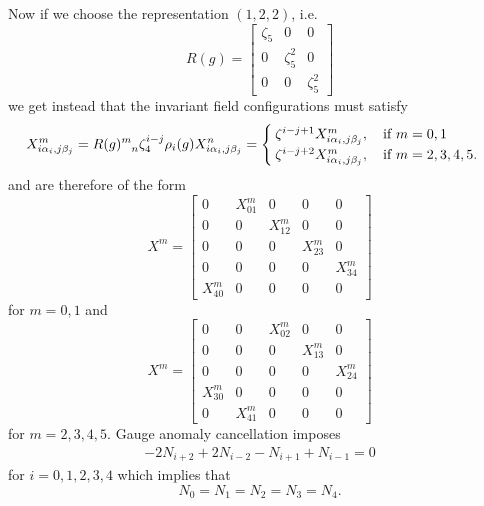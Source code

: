             Now if we choose the representation $(1,2,2)$, i.e.
            \begin{equation}
                R(g)=
                \begin{bmatrix}
                    \zeta_5 & 0 & 0\\
                    0 & \zeta^2_5 & 0\\
                    0 & 0 & \zeta^2_5
                \end{bmatrix}
            \end{equation}
            we get instead that the invariant field configurations must satisfy
            \begin{equation}
                X^m_{i\alpha_i,j\beta_j} = R(g)\indices{^m_n}\zeta^{i-j}_4\rho_i(g)X^n_{i\alpha_i,j\beta_j} =
                \begin{cases}
                    \zeta^{i-j+1}X^m_{i\alpha_i,j\beta_j},\quad\text{if } m=0,1\\
                    \zeta^{i-j+2}X^m_{i\alpha_i,j\beta_j},\quad\text{if } m=2,3,4,5.
                \end{cases}
            \end{equation}
            and are therefore of the form
            \begin{equation}
                X^m = 
                \begin{bmatrix}
                    0 & X^m_{01} & 0 & 0 & 0\\
                    0 & 0 & X^m_{12} & 0 & 0\\
                    0 & 0 & 0 & X^m_{23} & 0\\
                    0 & 0 & 0 & 0 & X^m_{34}\\
                    X^m_{40} & 0 & 0 & 0 & 0
                \end{bmatrix}
            \end{equation}
            for $m=0,1$ and 
            \begin{equation}
                X^m = 
                \begin{bmatrix}
                    0 & 0 &  X^m_{02} & 0 & 0\\
                    0 & 0 & 0 &  X^m_{13} & 0\\
                    0 & 0 & 0 & 0 &  X^m_{24}\\
                    X^m_{30} & 0 & 0 & 0 & 0\\
                    0 &  X^m_{41} & 0 & 0 & 0
                \end{bmatrix}
            \end{equation}
            for $m=2,3,4,5$. Gauge anomaly cancellation imposes
            \begin{align}
                -2N_{i+2}+2N_{i-2}-N_{i+1}+N_{i-1}=0
            \end{align}
            for $i=0,1,2,3,4$ which implies that
            \begin{equation}
                N_0=N_1=N_2=N_3=N_4.
            \end{equation}

